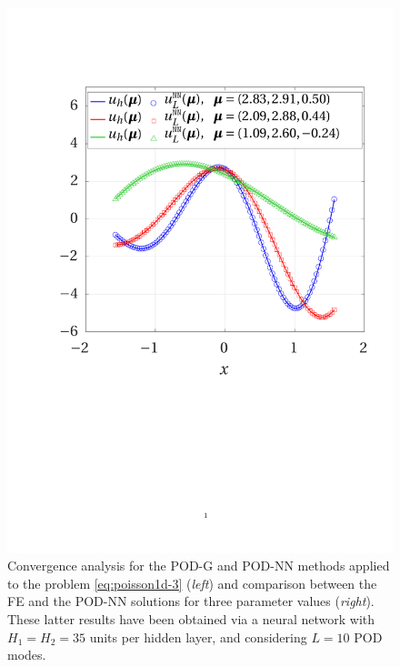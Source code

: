 \documentclass[12pt, a4paper, twoside, openright]{report}
\numberwithin{equation}{chapter}
\theoremstyle{theorem}
\theoremstyle{definition}
\theoremstyle{remark}
\theoremstyle{proposition}
\numberwithin{figure}{chapter}
\begin{document}
\begin{figure}[H]
			\includegraphics[scale = 0.42, trim = {1.5cm 9cm 1.5cm 2cm}, clip]{poisson1d_3_fe_vs_podnn}
			
			\caption{Convergence analysis for the POD-G and POD-NN methods applied to the problem \eqref{eq:poisson1d-3} (\emph{left}) and comparison between the FE and the POD-NN solutions for three parameter values (\emph{right}). These latter results have been obtained via a neural network with $H_1 = H_2 = 35$ units per hidden layer, and considering $L = 10$ POD modes.}
			\label{fig:poisson1d-3-fig2}
		\end{figure}
		
\end{document}
